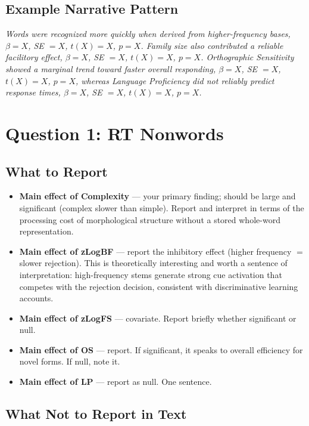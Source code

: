 \documentclass[12pt]{article}
\begin{document}
	\subsection*{Example Narrative Pattern}
	
	\textit{Words were recognized more quickly when derived from higher-frequency bases, $\beta = X$, SE $= X$, $t(X) = X$, $p = X$. Family size also contributed a reliable facilitory effect, $\beta = X$, SE $= X$, $t(X) = X$, $p = X$. Orthographic Sensitivity showed a marginal trend toward faster overall responding, $\beta = X$, SE $= X$, $t(X) = X$, $p = X$, whereas Language Proficiency did not reliably predict response times, $\beta = X$, SE $= X$, $t(X) = X$, $p = X$.}
	
	\section*{Question 1: RT Nonwords}
	
	\subsection*{What to Report}
	
	\begin{itemize}
		\item \textbf{Main effect of Complexity} --- your primary finding; should be large and significant (complex slower than simple). Report and interpret in terms of the processing cost of morphological structure without a stored whole-word representation.
		\item \textbf{Main effect of zLogBF} --- report the inhibitory effect (higher frequency $=$ slower rejection). This is theoretically interesting and worth a sentence of interpretation: high-frequency stems generate strong cue activation that competes with the rejection decision, consistent with discriminative learning accounts.
		\item \textbf{Main effect of zLogFS} --- covariate. Report briefly whether significant or null.
		\item \textbf{Main effect of OS} --- report. If significant, it speaks to overall efficiency for novel forms. If null, note it.
		\item \textbf{Main effect of LP} --- report as null. One sentence.
	\end{itemize}
	
	\subsection*{What Not to Report in Text}
	
\end{document}
